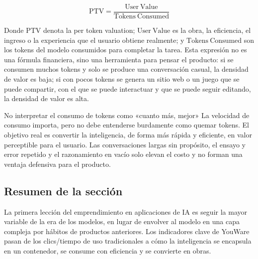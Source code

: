 \[
\mathrm{PTV}=\frac{\mathrm{User\ Value}}{\mathrm{Tokens\ Consumed}}
\]

Donde $\mathrm{PTV}$ denota la per token valuation; $\mathrm{User\ Value}$ es la obra, la eficiencia, el ingreso o la experiencia que el usuario obtiene realmente; y $\mathrm{Tokens\ Consumed}$ son los tokens del modelo consumidos para completar la tarea. Esta expresión no es una fórmula financiera, sino una herramienta para pensar el producto: si se consumen muchos tokens y solo se produce una conversación casual, la densidad de valor es baja; si con pocos tokens se genera un sitio web o un juego que se puede compartir, con el que se puede interactuar y que se puede seguir editando, la densidad de valor es alta.

\begin{warningbox}{No interpretar el consumo de tokens como «cuanto más, mejor»}
La velocidad de consumo importa, pero no debe entenderse burdamente como quemar tokens. El objetivo real es convertir la inteligencia, de forma más rápida y eficiente, en valor perceptible para el usuario. Las conversaciones largas sin propósito, el ensayo y error repetido y el razonamiento en vacío solo elevan el costo y no forman una ventaja defensiva para el producto.
\end{warningbox}

\subsection{Resumen de la sección}

La primera lección del emprendimiento en aplicaciones de IA es seguir la mayor variable de la era de los modelos, en lugar de envolver al modelo en una capa compleja por hábitos de productos anteriores. Los indicadores clave de YouWare pasan de los clics/tiempo de uso tradicionales a cómo la inteligencia se encapsula en un contenedor, se consume con eficiencia y se convierte en obras.
